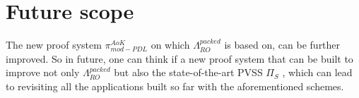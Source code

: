 \section*{Future scope}
The new proof system $\pi_{mod-PDL}^{AoK}$ on which $\Lambda_{RO}^{packed}$ is based on, 
can be further improved. So in future, one can think if a new proof system that can be built 
to improve not only $\Lambda_{RO}^{packed}$ but also the state-of-the-art PVSS $\Pi_{S}$ \cite{cryptoeprint:2023/1669}, 
which can lead to revisiting all the applications built so far with the aforementioned schemes.

